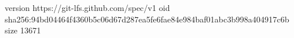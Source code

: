 version https://git-lfs.github.com/spec/v1
oid sha256:94bd04464f4360b5c06d67d287ea5fe6fae84e984baf01abc3b998a404917c6b
size 13671

